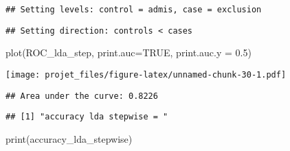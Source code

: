 \documentclass[
]{article}
\newenvironment{Shaded}{\begin{snugshade}}{\end{snugshade}}
\newcommand{\AttributeTok}[1]{\textcolor[rgb]{0.77,0.63,0.00}{#1}}
\newcommand{\CommentTok}[1]{\textcolor[rgb]{0.56,0.35,0.01}{\textit{#1}}}
\newcommand{\ConstantTok}[1]{\textcolor[rgb]{0.00,0.00,0.00}{#1}}
\newcommand{\FloatTok}[1]{\textcolor[rgb]{0.00,0.00,0.81}{#1}}
\newcommand{\FunctionTok}[1]{\textcolor[rgb]{0.00,0.00,0.00}{#1}}
\newcommand{\NormalTok}[1]{#1}
\newcommand{\OtherTok}[1]{\textcolor[rgb]{0.56,0.35,0.01}{#1}}
\newcommand{\SpecialCharTok}[1]{\textcolor[rgb]{0.00,0.00,0.00}{#1}}
\newcommand{\StringTok}[1]{\textcolor[rgb]{0.31,0.60,0.02}{#1}}
\begin{document}
\begin{verbatim}
## Setting levels: control = admis, case = exclusion
\end{verbatim}

\begin{verbatim}
## Setting direction: controls < cases
\end{verbatim}

\begin{Shaded}
\begin{Highlighting}[]
\FunctionTok{plot}\NormalTok{(ROC\_lda\_step, }\AttributeTok{print.auc=}\ConstantTok{TRUE}\NormalTok{,  }\AttributeTok{print.auc.y =} \FloatTok{0.5}\NormalTok{)}
\end{Highlighting}
\end{Shaded}

\texttt{[image: projet\_files/figure-latex/unnamed-chunk-30-1.pdf]}

\begin{Shaded}
\end{Shaded}

\begin{verbatim}
## Area under the curve: 0.8226
\end{verbatim}

\begin{Shaded}
\end{Shaded}

\begin{verbatim}
## [1] "accuracy lda stepwise = "
\end{verbatim}

\begin{Shaded}
\begin{Highlighting}[]
\FunctionTok{print}\NormalTok{(accuracy\_lda\_stepwise)}
\end{Highlighting}
\end{Shaded}
\end{document}
